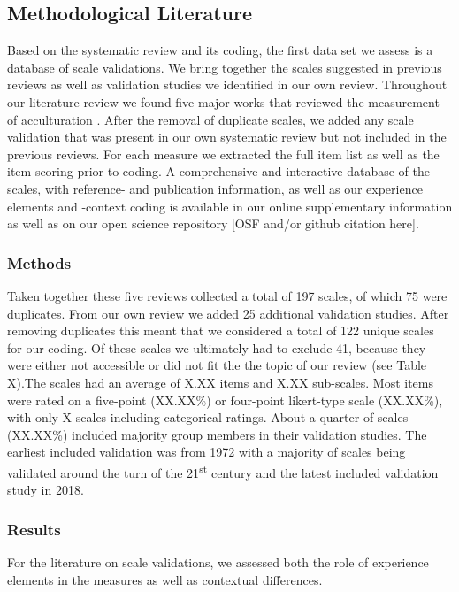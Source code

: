 \documentclass[man, 12pt, a4paper]{apa7}
\begin{document}
\subsection{Methodological Literature}
Based on the systematic review and its coding, the first data set we assess is a database of scale validations. We bring together the scales suggested in previous reviews as well as validation studies we identified in our own review. Throughout our literature review we found five major works that reviewed the measurement of acculturation \citep{Celenk2011, Maestas2000, Matsudaira2006, Wallace2010, Zane2004}. After the removal of duplicate scales, we added any scale validation that was present in our own systematic review but not included in the previous reviews. For each measure we extracted the full item list as well as the item scoring prior to coding. A comprehensive and interactive database of the scales, with reference- and publication information, as well as our experience elements and -context coding is available in our online supplementary information as well as on our open science repository [OSF and/or github citation here]. 

\subsubsection{Methods}
Taken together these five reviews collected a total of 197 scales, of which 75 were duplicates. From our own review we added 25 additional validation studies. After removing duplicates this meant that we considered a total of 122 unique scales for our coding. Of these scales we ultimately had to exclude 41, because they were either not accessible or did not fit the the topic of our review (see Table X).The scales had an average of X.XX items and X.XX sub-scales. Most items were rated on a five-point (XX.XX\%) or four-point likert-type scale (XX.XX\%), with only X scales including categorical ratings. About a quarter of scales (XX.XX\%) included majority group members in their validation studies. The earliest included validation was from 1972 with a majority of scales being validated around the turn of the 21\textsuperscript{st} century and the latest included validation study in 2018.

\subsubsection{Results}
For the literature on scale validations, we assessed both the role of experience elements in the measures as well as contextual differences. 
\end{document}
